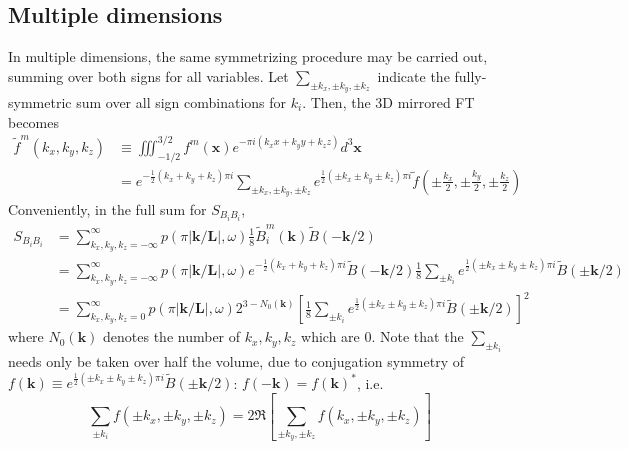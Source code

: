 \documentclass[11pt,english]{article}
\newcommand{\vc}[1]{\ensuremath{\bm{#1}}}
\begin{document}
\subsection{Multiple dimensions}
In multiple dimensions, the same symmetrizing procedure may be carried out,
	summing over both signs for all variables.
Let $\sum_{\pm k_x, \pm k_y, \pm k_z}$ indicate the fully-symmetric sum over all sign combinations for $k_i$.
Then, the 3D mirrored FT becomes
\begin{align}
	\tilde{f}^m(k_x,k_y,k_z) & \equiv \iiint_{-1/2}^{3/2} f^m(\vc x) e^{-\pi i (k_x x + k_y y + k_z z)} d^3\vc x \\
	& = e^{-\frac{1}{2}(k_x+k_y+k_z)\pi i}
		\sum_{\pm k_x, \pm k_y, \pm k_z}
			e^{\frac{1}{2}(\pm k_x \pm k_y \pm k_z)\pi i}
			\tilde f \left( \pm \frac{k_x}{2}, \pm \frac{k_y}{2}, \pm \frac{k_z}{2} \right)
\end{align}
Conveniently, in the full sum for $S_{B_i B_i}$,
\begin{align}
	S_{B_i B_i} & = \sum_{k_x,k_y,k_z = -\infty}^\infty p(\pi|\vc k/\vc L|,\omega) \frac{1}{8} \tilde B_i^m(\vc k) \tilde B(-\vc k / 2) \\
	& = \sum_{k_x,k_y,k_z = -\infty}^\infty p(\pi|\vc k / \vc L|,\omega)
		e^{-\frac{1}{2}(k_x+k_y+k_z)\pi i} \tilde B(-\vc k / 2)
		\frac{1}{8} \sum_{\pm k_i} e^{\frac{1}{2}(\pm k_x \pm k_y \pm k_z)\pi i} \tilde B(\pm \vc k / 2) \\
	& = \sum_{k_x,k_y,k_z = 0}^\infty p(\pi|\vc k / \vc L|,\omega) 2^{3 - N_0 (\vc k)}
		\left[\frac{1}{8}\sum_{\pm k_i} e^{\frac{1}{2}(\pm k_x \pm k_y \pm k_z)\pi i} \tilde B(\pm \vc k / 2)\right]^2
\end{align}
where $N_0(\vc k)$ denotes the number of ${k_x,k_y,k_z}$ which are 0.
Note that the $\sum_{\pm k_i}$ needs only be taken over half the volume,
	due to conjugation symmetry of $f(\vc k) \equiv e^{\frac{1}{2}(\pm k_x \pm k_y \pm k_z)\pi i} \tilde B(\pm \vc k / 2)$:
	$f(-\vc k) = f(\vc k)^*$, i.e.
\begin{equation}
	\sum_{\pm k_i} f(\pm k_x,\pm k_y,\pm k_z) = 2 \Re \left[ \sum_{\pm k_y,\pm k_z} f(k_x,\pm k_y,\pm k_z) \right]
\end{equation}
\end{document}
